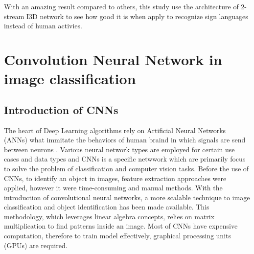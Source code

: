 \documentclass[a4paper, 12pt]{article}
\begin{document}
\begin{table}[H]
    \centering
    \caption{Comparision betwen models on several human activity datasets \citep{carreira2017quo}}
    \label{table comparision result of models}
\end{table}

With an amazing result compared to others, this study use the architecture of 2-stream I3D network to see how good it is when apply to recognize sign languages instead of human activies.

\newpage

\section{Convolution Neural Network in image classification}
\subsection{Introduction of CNNs}
The heart of Deep Learning algorithms rely on Artificial Neural Networks (ANNs) what immitate the behaviors of human braind in which signals are send between neurons \citep{ibmANN}. Various neural network types are employed for certain use cases and data types and CNNs is a specific netwwork which are primarily focus to solve the problem of classification and computer vision tasks. Before the use of CNNs, to identify an object in images, feature extraction approaches were applied, however it were time-consuming and manual methods. With the introduction of convolutional neural networks, a more scalable technique to image classification and object identification has been made available. This methodology, which leverages linear algebra concepts, relies on matrix multiplication to find patterns inside an image. Most of CNNs have expensive computation, therefore to train model effectively, graphical processing units (GPUs) are required.
\end{document}
